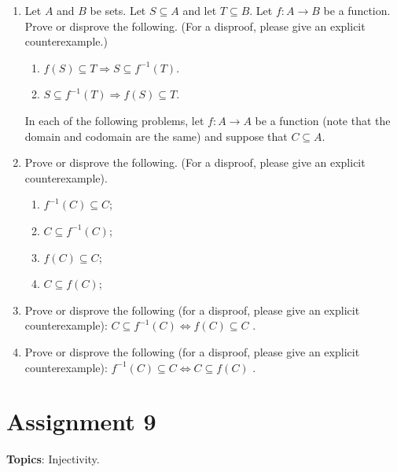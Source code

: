 \documentclass[12pt]{article}
\newcommand{\warning}{
\smallskip
\begin{center}
  {\color{red} {\huge\Stopsign} \hspace{1pt}  IN PROGRESS!} {\color{blue}Check back later for the final assignment.} {\color{red} {\huge\Stopsign} }
\end{center}
\smallskip
\AddToShipoutPictureBG*{\AtTextLowerLeft{\llap{\rotatebox[origin=lb]{90}{\large\sffamily\hspace{2.5in}
  {\color{red} {\huge\Stopsign} \hspace{1pt}  IN PROGRESS!} {\color{blue}Check back later for the final assignment.} {\color{red} {\huge\Stopsign} }
      }\quad\rule{0.8pt}{\textheight}\enspace}}}
}
\begin{document}
\begin{enumerate}
\item Let $A$ and $B$ be sets. Let $S \subseteq A$ and let $T \subseteq B$. Let $f\colon A \to B$ be a function. Prove or disprove the following. (For a disproof, please give an explicit counterexample.)
 \begin{enumerate}
 \item $f(S) \subseteq T \Rightarrow S \subseteq f^{-1}(T)$.
 \item $S \subseteq f^{-1}(T) \Rightarrow f(S) \subseteq T$.
 \end{enumerate}

\newpage
\noindent In each of the following problems, let $f\colon A \to A$ be a function (note that the domain and codomain are the same) and suppose that $C \subseteq A$.
 
\item  Prove or disprove the following. (For a disproof, please give an explicit counterexample).
 \begin{enumerate}
 \item $f^{-1}(C)\subseteq  C$;
 \item $C\subseteq  f^{-1}(C)$;
 \item $f(C)\subseteq  C$;
 \item $C\subseteq  f(C)$;
 \end{enumerate}
 


\item Prove or disprove the following (for a disproof, please give an explicit counterexample): $C \subseteq  f^{-1}(C) \iff f(C)\subseteq  C$ . 

\item Prove or disprove the following (for a disproof, please give an explicit counterexample): $f^{-1}(C)\subseteq  C \iff C\subseteq  f(C)$ .
  
\end{enumerate}

\newpage
\section[9 (due \csname dateWeek9\endcsname): Injectivity.]{Assignment 9}


\noindent\textbf{Topics}: Injectivity.
\\
\end{document}
